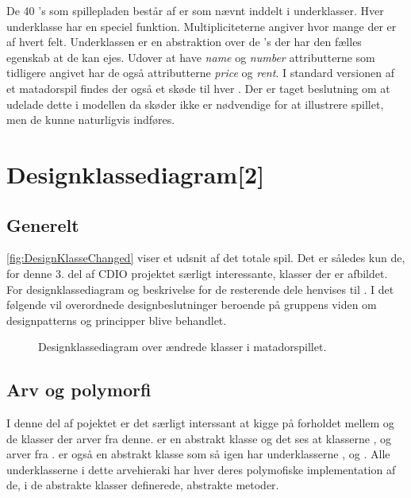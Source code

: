 De 40 's som spillepladen består af er som nævnt inddelt i underklasser. Hver underklasse har en speciel funktion. Multipliciteterne angiver hvor mange der er af hvert felt. Underklassen  er en abstraktion over de 's der har den fælles egenskab at de kan ejes. Udover at have \textit{name} og \textit{number} attributterne som tidligere angivet har de også attributterne \textit{price} og \textit{rent}. I standard versionen af et matadorspil findes der også et skøde til hver . Der er taget beslutning om at udelade dette i modellen da skøder ikke er nødvendige for at illustrere spillet, men de kunne naturligvis indføres.           

\section{Designklassediagram[2]}\label{sec:desKlas}
\subsection{Generelt}
\vref{fig:DesignKlasseChanged} viser et udsnit af det totale spil. Det er således kun de, for denne 3. del af CDIO projektet særligt interessante, klasser der er afbildet. For designklassediagram og beskrivelse for de resterende dele henvises til \cite{CDIORapportDel2}. I det følgende vil overordnede designbeslutninger beroende på gruppens viden om designpatterns og principper blive behandlet.

\begin{figure}
\caption{Designklassediagram over ændrede klasser i matadorspillet.}\label{fig:DesignKlasseChanged}
\centering

\end{figure}

\subsection{Arv og polymorfi}
I denne del af pojektet er det særligt interssant at kigge på forholdet mellem  og de klasser der arver fra denne. er en abstrakt klasse og det ses at klasserne ,  og  arver fra .  er også en abstrakt klasse som så igen har underklasserne ,  og . Alle underklasserne i dette arvehieraki har hver deres polymofiske implementation af de, i de abstrakte klasser definerede, abstrakte metoder. 

